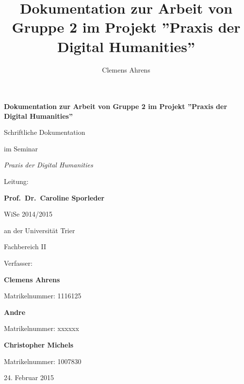 \documentclass[a4paper,12pt,titlepage=true, ngerman]{scrartcl}
\title{Dokumentation zur Arbeit von Gruppe 2 im Projekt ''Praxis der Digital Humanities''} %
\author{Clemens Ahrens}
\begin{document}
\begin{titlepage}

\begin{center}

\vspace*{100pt}

\textbf{\Large{Dokumentation zur Arbeit von Gruppe 2 im Projekt ''Praxis der Digital Humanities''}}%

\vfill

Schriftliche Dokumentation

im Seminar

\emph{Praxis der Digital Humanities}


Leitung:

\textbf{Prof.\ Dr.\ Caroline Sporleder}%

WiSe 2014/2015%

\bigskip
\bigskip

an der Universität Trier

Fachbereich II

\bigskip
\bigskip

Verfasser:


\textbf{Clemens Ahrens}

Matrikelnummer: 1116125

\textbf{Andre} %

Matrikelnummer: xxxxxx

\textbf{Christopher Michels} %

Matrikelnummer: 1007830

\bigskip
\bigskip

24. Februar 2015

\vfill

\end{center}

\end{titlepage}







\newpage

 \tableofcontents%
\end{document}
